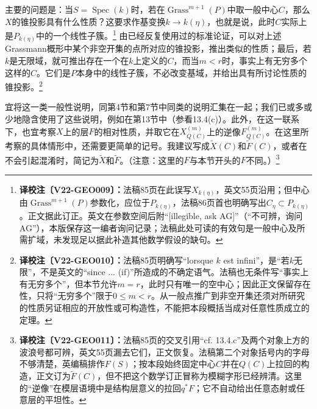 \documentclass[UTF8,a4paper]{ctexbook}
\newcommand{\cmt}[2]{\footnote{\textbf{译校注〔#1〕：}#2}}
\begin{document}
主要的问题是：当$S=\operatorname{Spec}(k)$时，若在$\operatorname{Grass}^{m+1}(P)$中取一般中心$C$，那么$X$的锥投影具有什么性质？这要求作基变换$k\to k(\eta)$，也就是说，此时$C$实际上是$P_{k(\eta)}$中的一个线性子簇。\cmt{V22-GEO009}{法稿85页在此误写$X_{k(\eta)}$，英文55页沿用；但中心由$\operatorname{Grass}^{m+1}(P)$参数化，应位于$P_{k(\eta)}$，法稿86页首也明确写出$C_\eta\subset P_{k(\eta)}$。正文据此订正。英文在参数空间后附“[illegible, ask AG]”（“不可辨，询问AG”），本版保存这一编者询问记录；法稿此处可读的有效句是一般中心及所需扩域，未发现足以据此补造其他数学假设的缺句。}
由已经反复使用过的标准论证，可以对上述Grassmann概形中某个非空开集的点所对应的锥投影，推出类似的性质；最后，若$k$是无限域，就可推出存在一个在$k$上定义的$C$，而当$m<r$时，事实上有无穷多个这样的$C$。它们是$P$本身中的线性子簇，不必改变基域，并给出具有所讨论性质的锥投影。\cmt{V22-GEO010}{法稿85页明确写“lorsque $k$ est infini”，是“若$k$无限”，不是英文的“since ... (if)”所造成的不确定语气。法稿也无条件写“事实上有无穷多个”，但本节允许$m=r$，此时只有唯一的空中心；因此正文保留存在性，只将“无穷多个”限于$0\le m<r$。从一般点推广到非空开集还须对所研究的性质另证相应的开放性或可构造性，不能把本段概括当成对任意性质成立的定理。}

宜将这一类一般性说明，同第4节和第7节中同类的说明汇集在一起；我们已或多或少地隐含使用了这些说明，例如在第13节中（参看13.4(c)）。此外，在这一联系下，也宜考察$X$上的层$F$的相对性质，并取它在$X^{(m)}_{Q(C)}$上的逆像$F^{(m)}_{Q(C)}$。在这里所考察的具体情形中，还需要更简单的记号。我建议写成$\widetilde X(C)$和$\widetilde F(C)$，或者在不会引起混淆时，简记为$\widetilde X$和$\widetilde F$。（注意：这里的$F$与本节开头的$F$不同。）\cmt{V22-GEO011}{法稿85页的交叉引用“cf. 13.4.c”及两个对象上方的波浪号都可辨，英文55页漏去它们，正文恢复。法稿第二个对象括号内的字母不够清楚，英编稿排作$F(S)$；按本段始终固定中心$C$并在$Q(C)$上拉回的构造，正文订为$\widetilde F(C)$，但不把这个数学订正冒称为模糊字形已经辨清。这里的“逆像”在模层语境中是结构层意义的拉回$q^*F$；它不自动给出任意态射或任意层的平坦性。}
\end{document}
